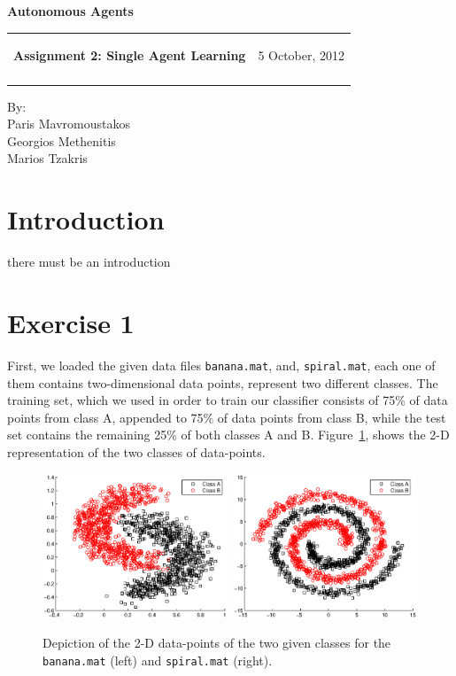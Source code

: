 \documentclass[a4paper,11pt]{article}
\makeatletter
\newcommand{\resheading}[1]{{\large \colorbox{mygrey}{\begin{minipage}{\textwidth}{\textbf{#1 \vphantom{p\^{E}}}}\end{minipage}}}}
\newcommand{\mywebheader}{
  \begin{tabular}{@{}p{5in}p{4in}}
  {\resheading{Assignment 2: Single Agent Learning}} & {\Large 5 October, 2012}\\\vspace{0.2cm}
  \end{tabular}}
\makeatother
\begin{document}
\begin{center}
{\LARGE \textbf{Autonomous Agents}}\\ [1em]
\end{center}
\mywebheader

\begin{center}
{\Large By:} \\ \vspace{0.1cm}
{\Large Paris Mavromoustakos} \\  \vspace{0.1cm}
{\Large Georgios Methenitis} \\ \vspace{0.1cm}
{\Large Marios Tzakris}
\end{center}

\section*{Introduction}
there must be an introduction



\section*{Exercise 1}

First, we loaded the given data files \texttt{banana.mat}, and, \texttt{spiral.mat}, each one of them contains two-dimensional data points, represent two different classes. The training set, which we used in order to train our classifier consists of 75\% of data points from class A, appended to 75\% of data points from class B, while the test set contains the remaining 25\% of both classes A and B. Figure~\ref{fig1}, shows the 2-D representation of the two classes of data-points.

\begin{figure}[h!]
  \centering   
      \includegraphics[width=0.49\textwidth]{figures/ABclasses.eps}\		
      \includegraphics[width=0.49\textwidth]{figures/ABclassesSp.eps}
      
  \caption{Depiction of the 2-D data-points of the two given classes for the \texttt{banana.mat} (left) and \texttt{spiral.mat} (right).}
  \label{fig1}
\end{figure}
\end{document}
